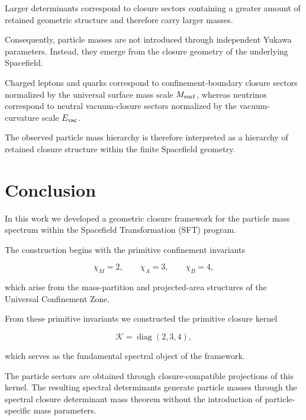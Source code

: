 \documentclass[11pt]{article}
\theoremstyle{definition}
\theoremstyle{remark}
\begin{document}
Larger determinants correspond to closure sectors containing a
greater amount of retained geometric structure and therefore
carry larger masses.

Consequently, particle masses are not introduced through
independent Yukawa parameters. Instead, they emerge from the
closure geometry of the underlying Spacefield.

Charged leptons and quarks correspond to confinement-boundary
closure sectors normalized by the universal surface mass scale
\(M_{\rm surf}\), whereas neutrinos correspond to neutral
vacuum-closure sectors normalized by the vacuum-curvature scale
\(E_{\rm vac}\).

The observed particle mass hierarchy is therefore interpreted as
a hierarchy of retained closure structure within the finite
Spacefield geometry.



\section{Conclusion}
\label{sec:conclusion}

In this work we developed a geometric closure framework for the
particle mass spectrum within the Spacefield Transformation
(SFT) program.

The construction begins with the primitive confinement
invariants

\begin{equation}
\chi_M = 2,
\qquad
\chi_A = 3,
\qquad
\chi_B = 4,
\end{equation}

which arise from the mass-partition and projected-area
structures of the Universal Confinement Zone.

From these primitive invariants we constructed the primitive
closure kernel

\begin{equation}
\mathcal K
=
\operatorname{diag}(2,3,4),
\end{equation}

which serves as the fundamental spectral object of the
framework.

The particle sectors are obtained through closure-compatible
projections of this kernel. The resulting spectral determinants
generate particle masses through the spectral closure
determinant mass theorem without the introduction of
particle-specific mass parameters.
\end{document}
